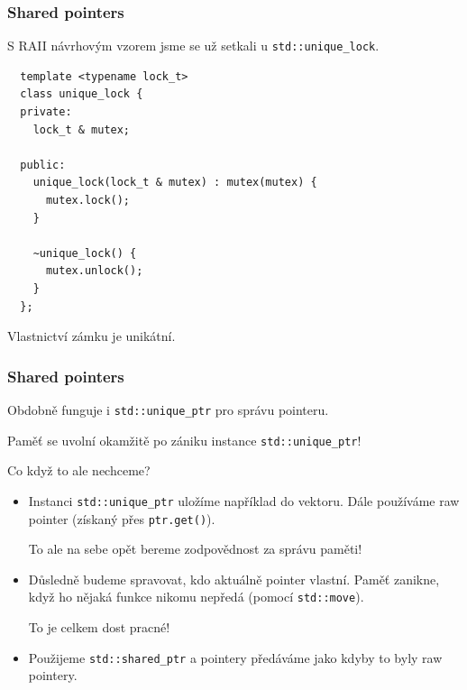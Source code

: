 \documentclass[usenames,dvipsnames,9pt]{beamer}
\begin{document}
\begin{frame}[fragile]
  \frametitle{Shared pointers}

  S RAII návrhovým vzorem jsme se už setkali u \texttt{std::unique_lock}.

  \begin{verbatim}
  template <typename lock_t>
  class unique_lock {
  private:
    lock_t & mutex;

  public:
    unique_lock(lock_t & mutex) : mutex(mutex) {
      mutex.lock();
    }

    ~unique_lock() {
      mutex.unlock();
    }
  };
  \end{verbatim}

  \pause
  \begin{center}
  	\Large Vlastnictví zámku je unikátní.
  \end{center}
\end{frame}

\begin{frame}[fragile]
  \frametitle{Shared pointers}

  Obdobně funguje i \texttt{std::unique\_ptr} pro správu pointeru.

  \hfill Paměť se uvolní okamžitě po zániku instance \texttt{std::unique\_ptr}!

  \vspace{0.5em}
  \begin{center}
  	\Large Co když to ale nechceme?
  \end{center}

  \vspace{2em}
  \begin{itemize}
  	\pause\item Instanci \texttt{std::unique\_ptr} uložíme například do vektoru.
  				Dále používáme raw pointer (získaný přes \texttt{ptr.get()}).

  				\hfill To ale na sebe opět bereme zodpovědnost za správu paměti! \\[0.3em]

  	\pause\item Důsledně budeme spravovat, kdo aktuálně pointer vlastní.
  				Paměť zanikne, když ho nějaká funkce nikomu nepředá (pomocí \texttt{std::move}).

  				\hfill To je celkem dost pracné! \\[0.3em]

  	\pause\item Použijeme \texttt{std::shared\_ptr} a pointery předáváme jako kdyby to byly raw pointery.
  \end{itemize}
\end{frame}
\end{document}
